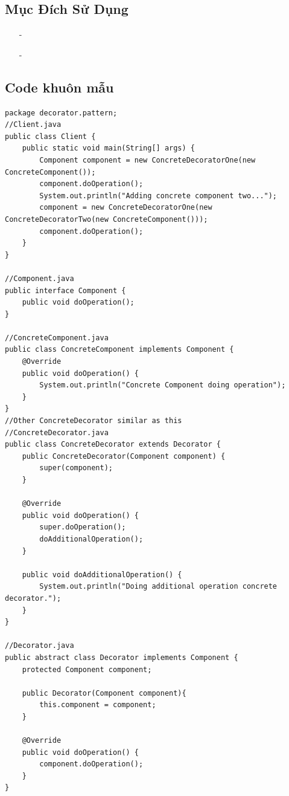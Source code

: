\documentclass{article}
\newcommand\subpara{\fontsize{13}{13}\selectfont \fontseries{b}\selectfont}
\begin{document}
    \subsection{Mục Đích Sử Dụng}
    \begin{itemize}
        \item[-]\subpara{Thêm tính năng mới cho đối tượng mà không ảnh hưởng đến các đối tượng}
        \item[-]\subpara{Trong các trường hợp mà việc sử dụng kế thừa sẽ mất nhiều công sức trong việc viết code hoặc không thể mở rộng đối tượng bằng thừa kế}
    \end{itemize}


    \subsection{Code khuôn mẫu}
    \begin{lstlisting}
package decorator.pattern;
//Client.java
public class Client {
    public static void main(String[] args) {
        Component component = new ConcreteDecoratorOne(new ConcreteComponent());
        component.doOperation();
        System.out.println("Adding concrete component two...");
        component = new ConcreteDecoratorOne(new ConcreteDecoratorTwo(new ConcreteComponent()));
        component.doOperation();
    }
}

//Component.java
public interface Component {
    public void doOperation();
}

//ConcreteComponent.java
public class ConcreteComponent implements Component {
    @Override
    public void doOperation() {
        System.out.println("Concrete Component doing operation");
    }
}
//Other ConcreteDecorator similar as this
//ConcreteDecorator.java
public class ConcreteDecorator extends Decorator {
    public ConcreteDecorator(Component component) {
        super(component);
    }

    @Override
    public void doOperation() {
        super.doOperation();
        doAdditionalOperation();
    }

    public void doAdditionalOperation() {
        System.out.println("Doing additional operation concrete decorator.");
    }
}

//Decorator.java
public abstract class Decorator implements Component {
    protected Component component;

    public Decorator(Component component){
        this.component = component;
    }

    @Override
    public void doOperation() {
        component.doOperation();
    }
}
    \end{lstlisting}
\end{document}
